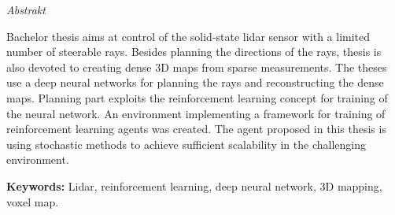 \vfill
\begin{center}
{\it \large Abstrakt}
\vspace{0.2cm}

\begin{minipage}{0.8\textwidth}{
Bachelor thesis aims at control of the solid-state lidar sensor with a limited number of steerable rays. Besides planning the directions of the rays, thesis is also devoted to creating dense 3D maps from sparse measurements. The theses use a deep neural networks for planning the rays and reconstructing the dense maps. Planning part exploits the reinforcement learning concept for training of the neural network. An environment implementing a framework for training of reinforcement learning agents was created. The agent proposed in this thesis is using stochastic methods to achieve sufficient scalability in the challenging environment.
\vspace{3mm}
\par \textbf{Keywords:} Lidar, reinforcement learning, deep neural network, 3D mapping, voxel map.
}
\end{minipage}
\end{center}
\vfill
\vspace{1cm}
\newpage{}

